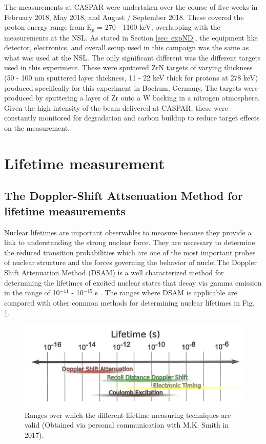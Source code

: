 The measurements at CASPAR were undertaken over the course of five weeks in February 2018, May 2018, and August / September 2018. These covered the proton energy range from E$_{p}$ = 270 - 1100 keV, overlapping with the measurements at the NSL. As stated in Section \ref{sec: expND}, the equipment like detector, electronics, and overall setup used in this campaign was the same as what was used at the NSL. The only significant different was the different targets used in this experiment. These were sputtered ZrN targets of varying thickness (50 - 100 nm sputtered layer thickness, 11 - 22 keV thick for protons at 278 keV) produced specifically for this experiment in Bochum, Germany. The targets were produced by sputtering a layer of Zr onto a W backing in a nitrogen atmosphere. Given the high intensity of the beam delivered at CASPAR, these were constantly monitored for degradation and carbon buildup to reduce target effects on the measurement. 





\section{Lifetime measurement}
\label{sec: lifetime experiment}

\subsection{The Doppler-Shift Attsenuation Method for lifetime measurements}
\label{sec: DSAM}


Nuclear lifetimes are important observables to measure because they provide a link to understanding the strong nuclear force. They are necessary to determine the reduced transition probabilities which are one of the most important probes of nuclear structure and the forces governing the behavior of nuclei.The Doppler Shift Attenuation Method (DSAM) is a well characterized method for determining the lifetimes of excited nuclear states that decay via gamma emission in the range of 10$^{-11}$ - 10$^{-15}$ s \cite{Blaugrund1966}. The ranges where DSAM is applicable are compared with other common methods for determining nuclear lifetimes in Fig. \ref{fig: lifetimeRanges}. 


\begin{figure}
\includegraphics[width=\linewidth]{figures/lifetimeTechniques.png}
\caption{Ranges over which the different lifetime measuring techniques are valid (Obtained via personal communication with M.K. Smith in 2017).}
\label{fig: lifetimeRanges}
\end{figure}


